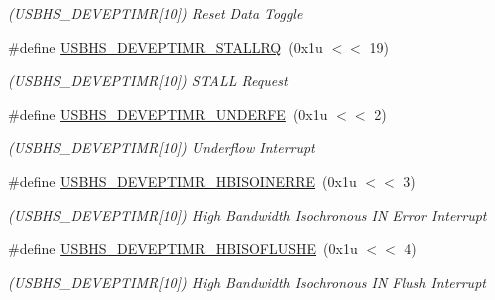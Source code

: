\begin{DoxyCompactItemize}
\begin{DoxyCompactList}\small\item\em (U\+S\+B\+H\+S\+\_\+\+D\+E\+V\+E\+P\+T\+I\+MR\mbox{[}10\mbox{]}) Reset Data Toggle \end{DoxyCompactList}\item 
\mbox{\label{group__SAMV71__USBHS_ga9303a4c0d94535f879eec79d44321a5f}} 
\#define \mbox{\hyperlink{group__SAMV71__USBHS_ga9303a4c0d94535f879eec79d44321a5f}{U\+S\+B\+H\+S\+\_\+\+D\+E\+V\+E\+P\+T\+I\+M\+R\+\_\+\+S\+T\+A\+L\+L\+RQ}}~(0x1u $<$$<$ 19)
\begin{DoxyCompactList}\small\item\em (U\+S\+B\+H\+S\+\_\+\+D\+E\+V\+E\+P\+T\+I\+MR\mbox{[}10\mbox{]}) S\+T\+A\+LL Request \end{DoxyCompactList}\item 
\mbox{\label{group__SAMV71__USBHS_ga36687100163c9ee32cdf3da0cd3d1bb8}} 
\#define \mbox{\hyperlink{group__SAMV71__USBHS_ga36687100163c9ee32cdf3da0cd3d1bb8}{U\+S\+B\+H\+S\+\_\+\+D\+E\+V\+E\+P\+T\+I\+M\+R\+\_\+\+U\+N\+D\+E\+R\+FE}}~(0x1u $<$$<$ 2)
\begin{DoxyCompactList}\small\item\em (U\+S\+B\+H\+S\+\_\+\+D\+E\+V\+E\+P\+T\+I\+MR\mbox{[}10\mbox{]}) Underflow Interrupt \end{DoxyCompactList}\item 
\mbox{\label{group__SAMV71__USBHS_ga54e551347b283a2baeaf23522e7eacab}} 
\#define \mbox{\hyperlink{group__SAMV71__USBHS_ga54e551347b283a2baeaf23522e7eacab}{U\+S\+B\+H\+S\+\_\+\+D\+E\+V\+E\+P\+T\+I\+M\+R\+\_\+\+H\+B\+I\+S\+O\+I\+N\+E\+R\+RE}}~(0x1u $<$$<$ 3)
\begin{DoxyCompactList}\small\item\em (U\+S\+B\+H\+S\+\_\+\+D\+E\+V\+E\+P\+T\+I\+MR\mbox{[}10\mbox{]}) High Bandwidth Isochronous IN Error Interrupt \end{DoxyCompactList}\item 
\mbox{\label{group__SAMV71__USBHS_gaaed6d79e76bd673a011e23626c594991}} 
\#define \mbox{\hyperlink{group__SAMV71__USBHS_gaaed6d79e76bd673a011e23626c594991}{U\+S\+B\+H\+S\+\_\+\+D\+E\+V\+E\+P\+T\+I\+M\+R\+\_\+\+H\+B\+I\+S\+O\+F\+L\+U\+S\+HE}}~(0x1u $<$$<$ 4)
\begin{DoxyCompactList}\small\item\em (U\+S\+B\+H\+S\+\_\+\+D\+E\+V\+E\+P\+T\+I\+MR\mbox{[}10\mbox{]}) High Bandwidth Isochronous IN Flush Interrupt \end{DoxyCompactList}\item 

\end{DoxyCompactItemize}

